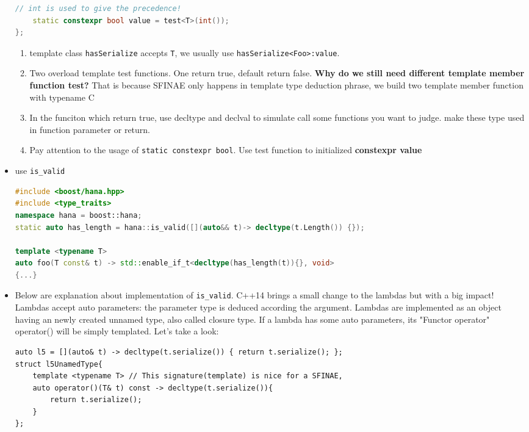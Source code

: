 \documentclass[a4paper,11pt,twoside]{book}
\begin{document}
\begin{itemize}
\begin{lstlisting}[frame=single, language=c++]
	// int is used to give the precedence!
	static constexpr bool value = test<T>(int());
};	
\end{lstlisting}
	
	\begin{enumerate}
		\item template class \texttt{hasSerialize} accepts \texttt{T}, we usually use \texttt{hasSerialize<Foo>:value}.
		
		\item Two overload template test functions. One return true, default return false. \textbf{Why do we still need different template member function test?} That is because SFINAE only happens in template type deduction phrase, we build two template member function with typename C
		
		\item In the funciton which return true, use decltype and declval to simulate call some functions you want to judge. make these type used in function parameter or return. 
		
		\item Pay attention to the usage of \texttt{static constexpr bool}. Use test function to initialized \textbf{constexpr value} 
	\end{enumerate}

\item use \texttt{is\_valid}
\begin{lstlisting}[frame=single, language=c++]
#include <boost/hana.hpp>
#include <type_traits>
namespace hana = boost::hana;
static auto has_length = hana::is_valid([](auto&& t)-> decltype(t.Length()) {});

template <typename T>
auto foo(T const& t) -> std::enable_if_t<decltype(has_length(t)){}, void>
{...}
\end{lstlisting}

	\item Below are explanation about implementation of \texttt{is\_valid}. C++14 brings a small change to the lambdas but with a big impact! Lambdas accept auto parameters: the parameter type is deduced according the argument. Lambdas are implemented as an object having an newly created unnamed type, also called closure type. If a lambda has some auto parameters, its "Functor operator" operator() will be simply templated. Let's take a look:

\begin{lstlisting}[numbers=none]
auto l5 = [](auto& t) -> decltype(t.serialize()) { return t.serialize(); };
struct l5UnamedType{
	template <typename T> // This signature(template) is nice for a SFINAE,  
	auto operator()(T& t) const -> decltype(t.serialize()){ 
		return t.serialize();
	}
};	
\end{lstlisting}


\end{itemize}
\end{document}
